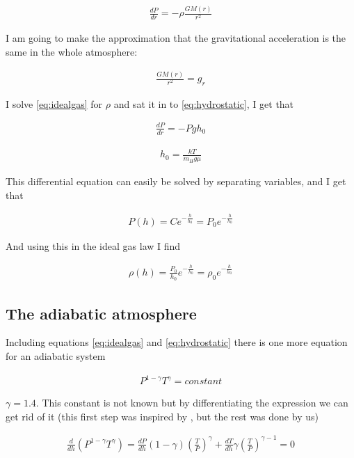 \documentclass[a4paper, 10pt]{article}
\begin{document}
\begin{align}\label{eq:hydrostatic}
\frac{dP}{dr} = -\rho \frac{GM(r)}{r^2}
\end{align}

I am going to make the approximation that the gravitational acceleration is the same in the whole atmosphere:

\begin{align}
\frac{GM(r)}{r^2} = g_r
\end{align}

I solve \ref{eq:idealgas} for $\rho$ and sat it in to \ref{eq:hydrostatic}, I get that

\begin{align}
\frac{dP}{dr} = -Pg h_0
\end{align}

\begin{align}
h_0 = \frac{kT}{m_H g \mu}
\end{align}

This differential equation can easily be solved by separating variables, and I get that

\begin{align}
P(h) = C e^{-\frac{h}{h_0}} = P_0 e^{-\frac{h}{h_0}}
\end{align}

And using this in the ideal gas law I find

\begin{align}
\rho (h) = \frac{P_0}{h_0} e^{-\frac{h}{h_0}} = \rho_0 e^{-\frac{h}{h_0}}
\end{align}

\subsection{The adiabatic atmosphere}
Including equations \ref{eq:idealgas} and \ref{eq:hydrostatic} there is one more equation for an adiabatic system

\begin{align}\label{eq:abiabatic}
P^{1-\gamma}T^{\gamma} = constant
\end{align}

$\gamma = 1.4$. This constant is not known but by differentiating the expression we can get rid of it (this first step was inspired by \cite{adia}, but the rest was done by us)

\begin{align}
\frac{d}{dh}(P^{1-\gamma}T^{\gamma}) = \frac{dP}{dh}(1-\gamma)\left(\frac{T}{P} \right)^{\gamma} + \frac{dT}{dh}\gamma \left(\frac{T}{P} \right)^{\gamma-1} = 0
\end{align}
\end{document}
